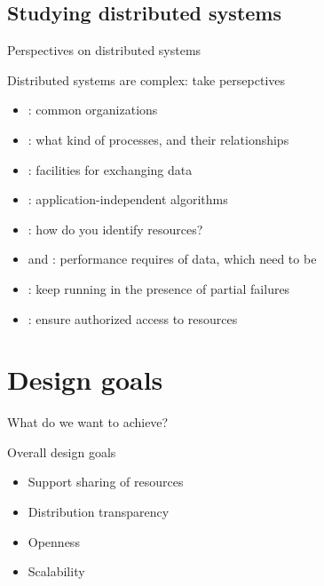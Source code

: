 \subsection{Studying distributed systems}
\begin{slide}{Perspectives on distributed systems}
  \begin{block}{Distributed systems are complex: take persepctives}
    \begin{itemize}\firmlist
    \item {}: common organizations
    \item {}: what kind of processes, and their relationships
    \item {}: facilities for exchanging data
    \item {}: application-independent algorithms
    \item {}: how do you identify resources?
    \item {} and : performance requires of data, which need to be 
    \item {}: keep running in the presence of partial failures
    \item {}: ensure authorized access to resources
    \end{itemize}
  \end{block}
\end{slide}
\section{Design goals}
\begin{slide}{What do we want to achieve?}
  \begin{block}{Overall design goals}
    \begin{itemize}
    \item Support sharing of resources
    \item Distribution transparency
    \item Openness
    \item Scalability
    \end{itemize}
  \end{block}
\end{slide}
